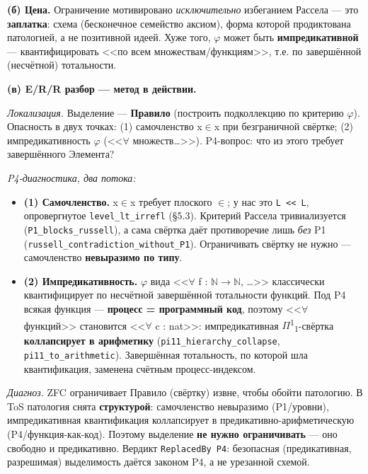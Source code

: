 \documentclass[11pt,a4paper]{article}
\begin{document}
\textbf{(б) Цена.} Ограничение мотивировано \emph{исключительно} избеганием Рассела --- это \textbf{заплатка}: схема (бесконечное семейство аксиом), форма которой продиктована патологией, а не позитивной идеей. Хуже того, $\varphi$ может быть \textbf{импредикативной} --- квантифицировать <<по всем множествам/функциям>>, т.е. по завершённой (несчётной) тотальности.

\textbf{(в) E/R/R разбор --- метод в действии.}

\emph{Локализация.} Выделение --- \textbf{Правило} (построить подколлекцию по критерию $\varphi$). Опасность в двух точках: (1) самочленство x$\in$x при безграничной свёртке; (2) импредикативность $\varphi$ (<<$\forall$ множеств\ldots{}>>). P4-вопрос: что из этого требует завершённого Элемента?

\emph{P4-диагностика, два потока:}
\begin{itemize}
\item \textbf{(1) Самочленство.} x$\in$x требует плоского $\in$; у нас это \texttt{L << L}, опровергнутое \texttt{level\_\allowbreak{}lt\_\allowbreak{}irrefl} (\S{}5.3). Критерий Рассела тривиализуется (\texttt{P1\_\allowbreak{}blocks\_\allowbreak{}russell}), а сама свёртка даёт противоречие лишь \emph{без} P1 (\texttt{russell\_\allowbreak{}contradiction\_\allowbreak{}without\_\allowbreak{}P1}). Ограничивать свёртку не нужно --- самочленство \textbf{невыразимо по типу}.
\item \textbf{(2) Импредикативность.} $\varphi$ вида <<$\forall$ f : $\mathbb{N}$$\to$$\mathbb{N}$, \ldots{}>> классически квантифицирует по несчётной завершённой тотальности функций. Под P4 всякая функция --- \textbf{процесс = программный код}, поэтому <<$\forall$ функций>> становится <<$\forall$ c : nat>>: импредикативная $\Pi$\textsuperscript{1}\textsubscript{1}-свёртка \textbf{коллапсирует в арифметику} (\texttt{pi11\_\allowbreak{}hierarchy\_\allowbreak{}collapse}, \texttt{pi11\_\allowbreak{}to\_\allowbreak{}arithmetic}). Завершённая тотальность, по которой шла квантификация, заменена счётным процесс-индексом.
\end{itemize}

\emph{Диагноз.} ZFC ограничивает Правило (свёртку) извне, чтобы обойти патологию. В ToS патология снята \textbf{структурой}: самочленство невыразимо (P1/уровни), импредикативная квантификация коллапсирует в предикативно-арифметическую (P4/функция-как-код). Поэтому выделение \textbf{не нужно ограничивать} --- оно свободно и предикативно. Вердикт \texttt{Replaced\allowbreak{}By P4}: безопасная (предикативная, разрешимая) выделимость даётся законом P4, а не урезанной схемой.
\end{document}

